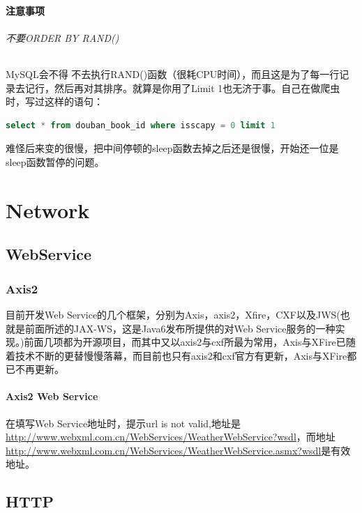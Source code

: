\documentclass[letter]{book}
\begin{document}
\subsection{注意事项}

\paragraph{不要ORDER BY RAND()}MySQL会不得 不去执行RAND()函数（很耗CPU时间），而且这是为了每一行记录去记行，然后再对其排序。就算是你用了Limit 1也无济于事。自己在做爬虫时，写过这样的语句：

\begin{lstlisting}[language=SQL]
select * from douban_book_id where isscapy = 0 limit 1
\end{lstlisting}

难怪后来变的很慢，把中间停顿的sleep函数去掉之后还是很慢，开始还一位是sleep函数暂停的问题。

\part{Network}

\chapter{WebService}

\section{Axis2}

目前开发Web Service的几个框架，分别为Axis，axis2，Xfire，CXF以及JWS(也就是前面所述的JAX-WS，这是Java6发布所提供的对Web Service服务的一种实现。)前面几项都为开源项目，而其中又以axis2与cxf所最为常用，Axis与XFire已随着技术不断的更替慢慢落幕，而目前也只有axis2和cxf官方有更新，Axis与XFire都已不再更新。

\subsection{Axis2 Web Service}

在填写Web Service地址时，提示url is not valid,地址是\url{http://www.webxml.com.cn/WebServices/WeatherWebService?wsdl}，而地址\url{http://www.webxml.com.cn/WebServices/WeatherWebService.asmx?wsdl}是有效地址。

\chapter{HTTP}
\end{document}
